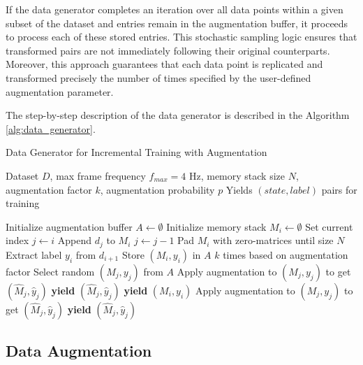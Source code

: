 If the data generator completes an iteration over all data points within a given subset of the dataset and entries remain in the augmentation buffer, it proceeds to process each of these stored entries. This stochastic sampling logic ensures that transformed pairs are not immediately following their original counterparts. Moreover, this approach guarantees that each data point is replicated and transformed precisely the number of times specified by the user-defined augmentation parameter.

The step-by-step description of the data generator is described in the Algorithm \ref{alg:data_generator}.

\begin{algorithm}[H]
  \caption{Data Generator for Incremental Training with Augmentation}
  \begin{algorithmic}[1]
    \Require Dataset $D$, max frame frequency $f_{max} = 4$ Hz, memory stack size $N$, augmentation factor $k$, augmentation probability $p$
    \Ensure Yields $(state, label)$ pairs for training

    \State Initialize augmentation buffer $A \gets \emptyset$
    \State Initialize memory stack $M_i \gets \emptyset$
    \State Set current index $j \gets i$
    \State Append $d_j$ to $M_i$
    \EndIf
    \State $j \gets j - 1$
    \EndWhile
    \State Pad $M_i$ with zero-matrices until size $N$
    \EndIf
    \State Extract label $y_i$ from $d_{i+1}$
    \State Store $(M_i, y_i)$ in $A$ $k$ times based on augmentation factor
    \State Select random $(M_j, y_j)$ from $A$
    \State Apply augmentation to $(M_j, y_j)$ to get $(\hat{M}_j, \hat{y}_j)$
    \State \textbf{yield} $(\hat{M}_j, \hat{y}_j)$
    \EndIf
    \State \textbf{yield} $(M_i, y_i)$
    \EndFor
    \State Apply augmentation to $(M_j, y_j)$ to get $(\hat{M}_j, \hat{y}_j)$
    \State \textbf{yield} $(\hat{M}_j, \hat{y}_j)$
    \EndFor
    \EndIf
  \end{algorithmic}
  \label{alg:data_generator}
\end{algorithm}

\subsection{Data Augmentation}
\label{sec:augmentation}

